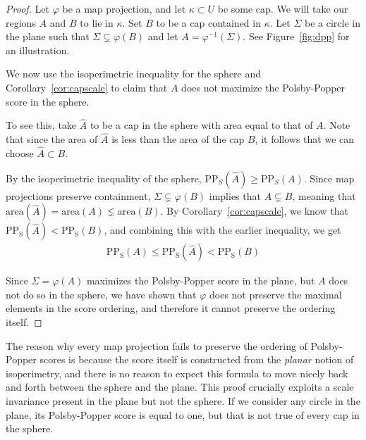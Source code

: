 \begin{proof}
  Let $\varphi$ be a map projection, and let 
  $\kappa \subset U$ be some cap. We will take our regions 
  $A$ and $B$ to lie in $\kappa$. Set $B$ to be a cap 
  contained in $\kappa$. Let $\Sigma$ be a circle in 
  the plane such that $\Sigma
  \subsetneq \varphi(B)$ and let $A=\varphi^{-1}(\Sigma)$. See
  Figure~\ref{fig:dpp} for an illustration.

  We now use the isoperimetric inequality for the sphere 
  and Corollary~\ref{cor:capscale} to claim that 
  $A$ does not maximize the Polsby-Popper score in the sphere.

  To see this, take $\hat{A}$ to be a cap in the sphere with 
  area equal to that of $A$. Note that since the 
  area of $\hat {A}$ is less than the area of the cap $B$, it 
  follows that we can choose $\hat{A}\subset B$. 
  
  By the isoperimetric inequality of the sphere, 
  $\mathrm{PP}_S(\hat{A})\geq
  \mathrm{PP}_S(A)$. Since map projections preserve containment,
  $\Sigma\subsetneq \varphi(B)$ implies that $A\subsetneq B$, 
  meaning that $\mathrm{area}(\hat A) = \mathrm{area}(A)\lneq 
  \mathrm{area}(B)$. By Corollary~\ref{cor:capscale}, we know that
  $\mathrm{PP_S}(\hat{A})< \mathrm{PP_S}(B)$, and combining this with
  the earlier inequality, we get
  \begin{align*}
    \mathrm{PP_S}({A})\leq \mathrm{PP_S}(\hat{A})< \mathrm{PP_S}(B)
  \end{align*}

  Since $\Sigma = \varphi(A)$ maximizes the Polsby-Popper score in the
  plane, but $A$ does not do so in the sphere, we have shown that
  $\varphi$ does not preserve the maximal elements in the score
  ordering, and therefore it cannot preserve the ordering itself.
\end{proof}

The reason why every map projection fails to preserve the ordering of
Polsby-Popper scores is because the score itself is constructed from
the \textit{planar} notion of isoperimetry, and there is no reason to
expect this formula to move nicely back and forth between the sphere
and the plane.  This proof crucially exploits a scale invariance
present in the plane but not the sphere.  If we consider any circle in
the plane, its Polsby-Popper score is equal to one,
but that is not true of every cap in the sphere.  
